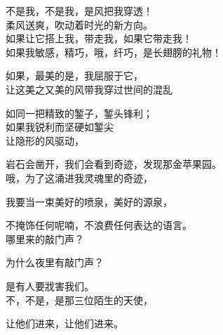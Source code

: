  {
 不是我，不是我，是风把我穿透！\\
 

柔风送爽，吹动着时光的新方向。\\


如果让它搭上我，带走我，如果它带走我！\\


如果我敏感，精巧，哦，纤巧，是长翅膀的礼物！

如果，最美的是，我屈服于它，\\


让这美之又美的风带我穿过世间的混乱

如同一把精致的錾子，錾头锋利；\\


如果我锐利而坚硬如錾尖\\


让隐形的风驱动，

岩石会凿开，我们会看到奇迹，发现那金苹果园。\\




哦，为了这涌进我灵魂里的奇迹，

我要当一束美好的喷泉，美好的源泉，

不掩饰任何呢喃，不浪费任何表达的语言。\\




哪里来的敲门声？

为什么夜里有敲门声？

是有人要戕害我们。
\\



不，不是，是那三位陌生的天使，

让他们进来，让他们进来。 
}
